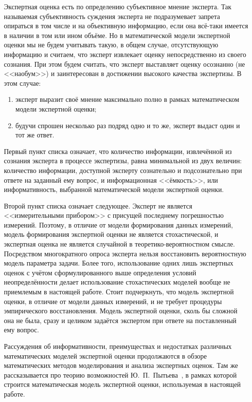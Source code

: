 Экспертная оценка есть по определению субъективное мнение эксперта. Так называемая субъективность суждения эксперта не подразумевает запрета опираться в том числе и на объективную информацию, если она всё-таки имеется в наличии в том или ином объёме. Но в математической модели экспертной оценки мы не будем учитывать такую, в общем случае, отсутствующую информацию и считаем, что эксперт извлекает оценку непосредственно из своего сознания. При этом будем считать, что эксперт выставляет оценку осознанно (не <<наобум>>) и заинтересован в достижении высокого качества экспертизы. %
В этом случае:
\begin{enumerate}
 \item эксперт выразит своё мнение максимально полно в рамках математическом модели экспертной оценки;
 \item будучи спрошен несколько раз подряд одно и то же, эксперт выдаст один и тот же ответ. 
\end{enumerate}

Первый пункт списка означает, что количество информации, извлечённой из сознания эксперта в процессе экспертизы, равна минимальной из двух величин: количество информации, доступной эксперту сознательно и подсознательно при ответе на заданный ему вопрос, и информационная <<ёмкость>>, или информативность, выбранной математической модели экспертной оценки.

Второй пункт списка означает следующее. Эксперт не является <<измерительными прибором>> с присущей последнему погрешностью измерений. Поэтому, в отличие от модели формирования данных измерений, модель формирования экспертной оценки не является стохастической, и экспертная оценка не является случайной в теоретико-вероятностном смысле. Посредством многократного опроса эксперта нельзя восстановить вероятностную модель параметра задачи. Более того, использование одних лишь экспертных оценок с учётом сформулированного выше определения условий неопределённости делает использование стохастических моделей вообще не приемлемым в настоящей работе. Стоит подчеркнуть, что модель экспертной оценки, в отличие от модели данных измерений, и не требует процедуры эмпирического восстановления. Модель экспертной оценки, сколь бы сложной она не была, сразу и целиком задаётся экспертом при ответе на поставленный ему вопрос.

Рассуждения об информативности, преимуществах и недостатках различных математических моделей экспертной оценки продолжаются в обзоре математических методов моделирования и анализа экспертных оценок. Там же рассказывается про теорию возможностей Ю.~П.~Пытьева~\cite{possbook}, %
в рамках которой строится математическая модель экспертной оценки, используемая в настоящей работе.  

